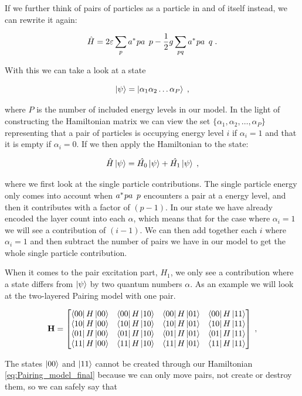 If we further think of pairs of particles as a particle in and of itself instead, we can rewrite it again:

$$\hat{H} = 2\varepsilon \sum_p \hc{a}{p}\op{a}{p} - \frac{1}{2}g\sum_{pq} \hc{a}{p}\op{a}{q} \; .$$

With this we can take a look at a state

$$\ket{\psi} = \ket{\alpha_{1}\alpha_{2}\dots\alpha_{P}} \;,$$

where $P$ is the number of included energy levels in our model. In the light of constructing the Hamiltonian matrix we can view the set $\{\alpha_1, \alpha_2, \dots, \alpha_P \}$ representing that a pair of particles is occupying energy level $i$ if $\alpha_i = 1$ and that it is empty if $\alpha_i = 0$. If we then apply the Hamiltonian to the state:

$$\hat{H} \ket{\psi} = \hat{H_0} \ket{\psi} + \hat{H_1} \ket{\psi} \;, $$

where we first look at the single particle contributions. The single particle energy only comes into account when $\hc{a}{p}\op{a}{p}$ encounters a pair at a energy level, and then it contributes with a factor of $(p-1)$. In our state we have already encoded the layer count into each $\alpha$, which means that for the case where $\alpha_i = 1$ we will see a contribution of $(i-1)$. We can then add together each $i$ where $\alpha_i = 1$ and then subtract the number of pairs we have in our model to get the whole single particle contribution. 

When it comes to the pair excitation part, $H_1$, we only see a contribution where a state differs from $\ket{\psi}$ by two quantum numbers $\alpha$. As an example we will look at the two-layered Pairing model with one pair.

$$\mathbf{H} = \begin{bmatrix}
\bra{00} H \ket{00} & \bra{00} H \ket{10} &\bra{00} H \ket{01} & \bra{00} H \ket{11} \\
\bra{10} H \ket{00} & \bra{10} H \ket{10} &\bra{10} H \ket{01} & \bra{10} H \ket{11} \\
\bra{01} H \ket{00} & \bra{01} H \ket{10} &\bra{01} H \ket{01} & \bra{01} H \ket{11} \\
\bra{11} H \ket{00} & \bra{11} H \ket{10} &\bra{11} H \ket{01} & \bra{11} H \ket{11} \\
\end{bmatrix} \; ,
$$

The states $\ket{00}$ and $\ket{11}$ cannot be created through our Hamiltonian \ref{eq:Pairing_model_final} because we can only move pairs, not create or destroy them, so we can safely say that 

